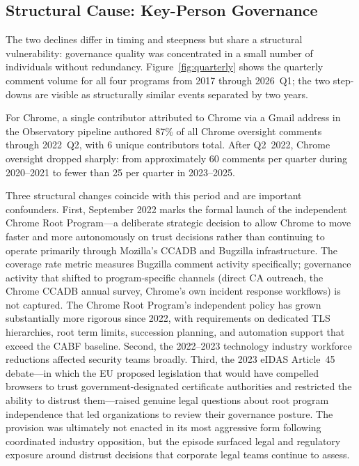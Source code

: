 \documentclass[10pt,twocolumn,letterpaper]{article}
\begin{document}
\subsection{Structural Cause: Key-Person Governance}
\label{sec:keyperson}

The two declines differ in timing and steepness but share a structural
vulnerability: governance quality was concentrated in a small number of
individuals without redundancy.
Figure~\ref{fig:quarterly} shows the quarterly comment volume for all
four programs from 2017 through 2026~Q1; the two step-downs are visible
as structurally similar events separated by two years.

For Chrome, a single contributor attributed to Chrome via a Gmail address
in the Observatory pipeline authored 87\% of all Chrome oversight comments
through 2022~Q2, with 6 unique contributors total. After Q2~2022, Chrome
oversight dropped sharply: from approximately 60 comments per quarter
during 2020--2021 to fewer than 25 per quarter in 2023--2025.

Three structural changes coincide with this period and are important
confounders. First, September 2022 marks the formal launch of the
independent Chrome Root Program---a deliberate strategic decision to allow
Chrome to move faster and more autonomously on trust decisions rather than
continuing to operate primarily through Mozilla's CCADB and Bugzilla
infrastructure. The coverage rate metric measures Bugzilla comment activity
specifically; governance activity that shifted to program-specific channels
(direct CA outreach, the Chrome CCADB annual survey, Chrome's own incident
response workflows) is not captured. The Chrome Root Program's independent
policy has grown substantially more rigorous since 2022, with requirements
on dedicated TLS hierarchies, root term limits, succession planning, and
automation support that exceed the CABF baseline. Second, the 2022--2023
technology industry workforce reductions affected security teams broadly.
Third, the 2023 eIDAS Article~45 debate---in which the EU proposed
legislation that would have compelled browsers to trust government-designated
certificate authorities and restricted the ability to distrust them---raised
genuine legal questions about root program independence that led organizations
to review their governance posture. The provision was ultimately not enacted
in its most aggressive form following coordinated industry opposition, but
the episode surfaced legal and regulatory exposure around distrust decisions
that corporate legal teams continue to assess.
\end{document}
